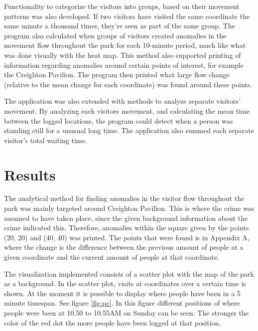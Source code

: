 \documentclass[journal]{vgtc}                %
\begin{document}
Functionality to categorize the visitors into groups, based on their movement patterns was also developed. If two visitors have visited the same coordinate the same minute a thousand times, they’re seen as part of the same group. The program also calculated when groups of visitors created anomalies in the movement flow throughout the park for each 10-minute period, much like what was done visually with the heat map. This method also supported printing of information regarding anomalies around certain points of interest, for example the Creighton Pavilion. The program then printed what large flow change (relative to the mean change for each coordinate) was found around these points. 

The application was also extended with methods to analyze separate visitors’ movement. By analyzing each visitors movement, and calculating the mean time between the logged locations, the program could detect when a person was standing still for a unusual long time. The application also summed each separate visitor’s total waiting time.


\section{Results}
The analytical method for finding anomalies in the visitor flow throughout the park was mainly targeted around Creighton Pavilion. This is where the crime was assumed to have taken place, since the given background information about the crime indicated this. Therefore, anomalies within the square given by the points (20, 20) and (40, 40) was printed. The points that were found is in Appendix A, where the change is the difference between the previous amount of people at a given coordinate and the current amount of people at that coordinate.

The visualization implemented consists of a scatter plot with the map of the park as a background. In the scatter plot, visits at coordinates over a certain time is shown. At the moment it is possible to display where people have been in a 5 minute timespan. See figure \ref{fig:pc}. In this figure different positions of where people were been at 10.50 to 10.55AM on Sunday can be seen. The stronger the color of the red dot the more people have been logged at that position.
\end{document}
